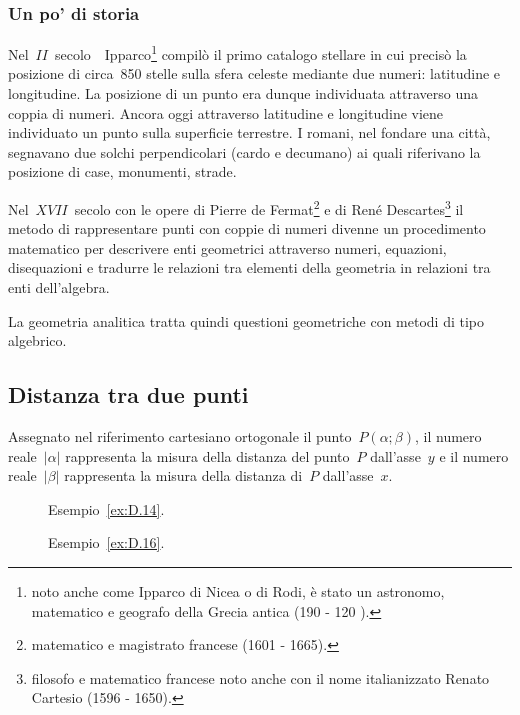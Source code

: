 \subsubsection*{Un po' di storia}
Nel~$II$~secolo~\aC\ Ipparco\footnote{noto anche come Ipparco di Nicea o di Rodi, è stato un astronomo, matematico e geografo della Grecia antica (190 \aC - 120 \aC).} compilò il primo catalogo stellare in cui precisò la posizione di circa~850 stelle sulla sfera celeste
mediante due numeri: latitudine e longitudine. La posizione di un punto era dunque individuata attraverso una coppia di numeri.
Ancora oggi attraverso latitudine e longitudine viene individuato un punto sulla superficie terrestre.
I romani, nel fondare una città, segnavano due solchi perpendicolari (cardo e decumano) ai quali riferivano la posizione di case, monumenti, strade.

Nel~$XVII$~secolo con le opere di Pierre de Fermat\footnote{matematico e magistrato francese (1601 - 1665).} e di René Descartes\footnote{filosofo e matematico francese noto anche con il nome italianizzato Renato Cartesio (1596 - 1650).} il metodo di rappresentare punti con coppie di numeri divenne
un procedimento matematico per descrivere enti geometrici attraverso numeri, equazioni, disequazioni e tradurre le relazioni
tra elementi della geometria in relazioni tra enti dell'algebra.

La geometria analitica tratta quindi questioni geometriche con metodi di tipo algebrico.

\vspazio\ovalbox{\risolvi \ref{ese:D.18}}

\subsection{Distanza tra due punti}
Assegnato nel riferimento cartesiano ortogonale il punto~$P(\alpha; \beta)$, il numero reale~$|\alpha|$ rappresenta la
misura della distanza del punto~$P$ dall'asse~$y$ e il numero reale~$|\beta|$ rappresenta la misura della distanza di~$P$
dall'asse~$x$.

\begin{figure}[b]
 \begin{minipage}[t]{.45\textwidth}
 \centering
 \caption{Esempio~\ref{ex:D.14}.}\label{fig:D.12}
 \end{minipage}\hfil
 \begin{minipage}[t]{.45\textwidth}
 \centering
 \caption{Esempio~\ref{ex:D.16}.}\label{fig:D.13}
 \end{minipage}
 \end{figure}

